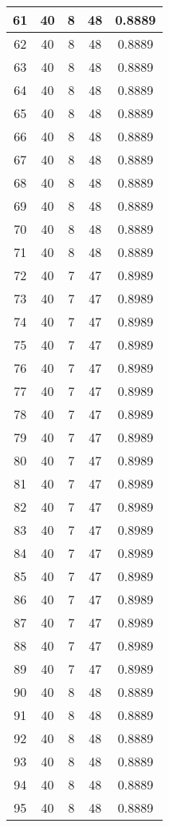\documentclass[letterpaper, 12pt]{article}
\begin{document}
\begin{longtable}{|c|c|c|c|c|}
61 & 40 & 8 & 48 & 0.8889 \\
\hline
62 & 40 & 8 & 48 & 0.8889 \\
\hline
63 & 40 & 8 & 48 & 0.8889 \\
\hline
64 & 40 & 8 & 48 & 0.8889 \\
\hline
65 & 40 & 8 & 48 & 0.8889 \\
\hline
66 & 40 & 8 & 48 & 0.8889 \\
\hline
67 & 40 & 8 & 48 & 0.8889 \\
\hline
68 & 40 & 8 & 48 & 0.8889 \\
\hline
69 & 40 & 8 & 48 & 0.8889 \\
\hline
70 & 40 & 8 & 48 & 0.8889 \\
\hline
71 & 40 & 8 & 48 & 0.8889 \\
\hline
72 & 40 & 7 & 47 & 0.8989 \\
\hline
73 & 40 & 7 & 47 & 0.8989 \\
\hline
74 & 40 & 7 & 47 & 0.8989 \\
\hline
75 & 40 & 7 & 47 & 0.8989 \\
\hline
76 & 40 & 7 & 47 & 0.8989 \\
\hline
77 & 40 & 7 & 47 & 0.8989 \\
\hline
78 & 40 & 7 & 47 & 0.8989 \\
\hline
79 & 40 & 7 & 47 & 0.8989 \\
\hline
80 & 40 & 7 & 47 & 0.8989 \\
\hline
81 & 40 & 7 & 47 & 0.8989 \\
\hline
82 & 40 & 7 & 47 & 0.8989 \\
\hline
83 & 40 & 7 & 47 & 0.8989 \\
\hline
84 & 40 & 7 & 47 & 0.8989 \\
\hline
85 & 40 & 7 & 47 & 0.8989 \\
\hline
86 & 40 & 7 & 47 & 0.8989 \\
\hline
87 & 40 & 7 & 47 & 0.8989 \\
\hline
88 & 40 & 7 & 47 & 0.8989 \\
\hline
89 & 40 & 7 & 47 & 0.8989 \\
\hline
90 & 40 & 8 & 48 & 0.8889 \\
\hline
91 & 40 & 8 & 48 & 0.8889 \\
\hline
92 & 40 & 8 & 48 & 0.8889 \\
\hline
93 & 40 & 8 & 48 & 0.8889 \\
\hline
94 & 40 & 8 & 48 & 0.8889 \\
\hline
95 & 40 & 8 & 48 & 0.8889 \\

\end{longtable}
\end{document}
